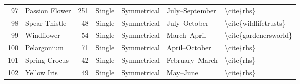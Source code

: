 \begin{table}
\begin{tabular}{rlrllll}
    97 &            Passion Flower &          251 &      Single &  Symmetrical &           July–September &              \textbackslash cite\{rhs\} \\
    98 &             Spear Thistle &           48 &      Single &  Symmetrical &             July–October &   \textbackslash cite\{wildlifetrusts\} \\
    99 &                Windflower &           54 &      Single &  Symmetrical &              March–April &   \textbackslash cite\{gardenersworld\} \\
   100 &               Pelargonium &           71 &      Single &  Symmetrical &            April–October &              \textbackslash cite\{rhs\} \\
   101 &             Spring Crocus &           42 &      Single &  Symmetrical &           February–March &              \textbackslash cite\{rhs\} \\
   102 &               Yellow Iris &           49 &      Single &  Symmetrical &                 May–June &              \textbackslash cite\{rhs\} \\
\bottomrule
\end{tabular}
\end{table}
